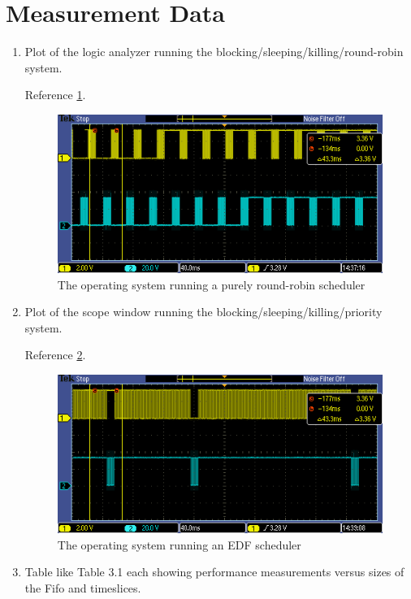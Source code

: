 \documentclass[12pt]{article}
\begin{document}
\section{Measurement Data}
\begin{enumerate}
\item Plot of the logic analyzer running the
  blocking/sleeping/killing/round-robin system.

  Reference \cref{fig:round-robin}.
  \begin{figure}
    \includegraphics{img/TEK00002}
    \caption{The operating system running a purely round-robin scheduler}
    \label{fig:round-robin}
  \end{figure}

\item Plot of the scope window running the
  blocking/sleeping/killing/priority system.

  Reference \cref{fig:edf}.
  \begin{figure}
    \includegraphics{img/TEK00003}
    \caption{The operating system running an EDF scheduler}
    \label{fig:edf}
  \end{figure}
\item Table like Table 3.1 each showing performance measurements
  versus sizes of the Fifo and timeslices.

\end{enumerate}
\end{document}
